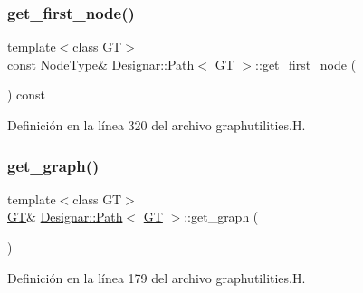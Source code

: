 \subsubsection{\texorpdfstring{get\+\_\+first\+\_\+node()}{get\_first\_node()}\hspace{0.1cm}{\footnotesize\ttfamily [2/2]}}
{\footnotesize\ttfamily template$<$class GT$>$ \\
const \hyperlink{class_designar_1_1_path_a7b499fd50e96e3360968d4cfef7a3736}{Node\+Type}\& \hyperlink{class_designar_1_1_path}{Designar\+::\+Path}$<$ \hyperlink{demo-buildgraph_8_c_a3001c40d2c31ca87ed96cd7d1334a55e}{GT} $>$\+::get\+\_\+first\+\_\+node (\begin{DoxyParamCaption}{ }\end{DoxyParamCaption}) const\hspace{0.3cm}{\ttfamily [inline]}}



Definición en la línea 320 del archivo graphutilities.\+H.

\mbox{\label{class_designar_1_1_path_a0d4ef1ffdb4bcf2b34267e33c2177773}} 
\subsubsection{\texorpdfstring{get\+\_\+graph()}{get\_graph()}}
{\footnotesize\ttfamily template$<$class GT$>$ \\
\hyperlink{demo-buildgraph_8_c_a3001c40d2c31ca87ed96cd7d1334a55e}{GT}\& \hyperlink{class_designar_1_1_path}{Designar\+::\+Path}$<$ \hyperlink{demo-buildgraph_8_c_a3001c40d2c31ca87ed96cd7d1334a55e}{GT} $>$\+::get\+\_\+graph (\begin{DoxyParamCaption}{ }\end{DoxyParamCaption})\hspace{0.3cm}{\ttfamily [inline]}}



Definición en la línea 179 del archivo graphutilities.\+H.

\mbox{\label{class_designar_1_1_path_aabe99f57d8d1c3ee500f5d6655b4fe68}} 
